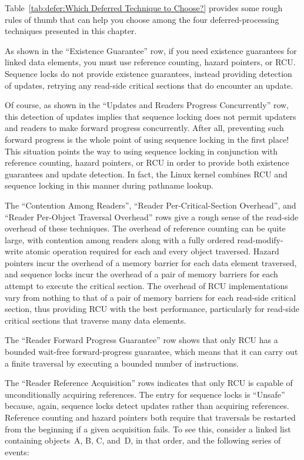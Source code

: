 Table~\ref{tab:defer:Which Deferred Technique to Choose?}
provides some rough rules of thumb that can help you choose among the
four deferred-processing techniques presented in this chapter.

As shown in the ``Existence Guarantee'' row,
if you need existence guarantees for linked
data elements, you must use reference counting, hazard pointers, or RCU.
Sequence locks do not provide existence guarantees, instead providing
detection of updates, retrying any read-side critical sections
that do encounter an update.

Of course, as shown in the ``Updates and Readers Progress Concurrently''
row, this detection of updates implies
that sequence locking does not permit updaters and readers to make forward
progress concurrently.
After all, preventing such forward progress is the whole point of using
sequence locking in the first place!
This situation points the way to using sequence locking in conjunction
with reference counting, hazard pointers, or RCU in order to provide
both existence guarantees and update detection.
In fact, the Linux kernel combines RCU and sequence locking in
this manner during pathname lookup.

The ``Contention Among Readers'', ``Reader Per-Critical-Section Overhead'',
and ``Reader Per-Object Traversal Overhead'' rows give a rough sense of
the read-side overhead of these techniques.
The overhead of reference counting can be quite large, with
contention among readers along with a fully ordered read-modify-write
atomic operation required for each and every object traversed.
Hazard pointers incur the overhead of a memory barrier for each data element
traversed, and sequence locks incur the overhead of a pair of memory barriers
for each attempt to execute the critical section.
The overhead of RCU implementations vary from nothing to that of a pair of
memory barriers for each read-side critical section, thus providing RCU
with the best performance, particularly for read-side critical sections
that traverse many data elements.

The ``Reader Forward Progress Guarantee'' row shows that only RCU
has a bounded wait-free forward-progress guarantee, which means that
it can carry out a finite traversal by executing a bounded number of
instructions.

The ``Reader Reference Acquisition'' rows indicates that only RCU is
capable of unconditionally acquiring references.
The entry for sequence locks is ``Unsafe'' because, again, sequence locks
detect updates rather than acquiring references.
Reference counting and hazard pointers both require that traversals be
restarted from the beginning if a given acquisition fails.
To see this, consider a linked list containing objects~A, B, C, and~D,
in that order, and the following series of events:

